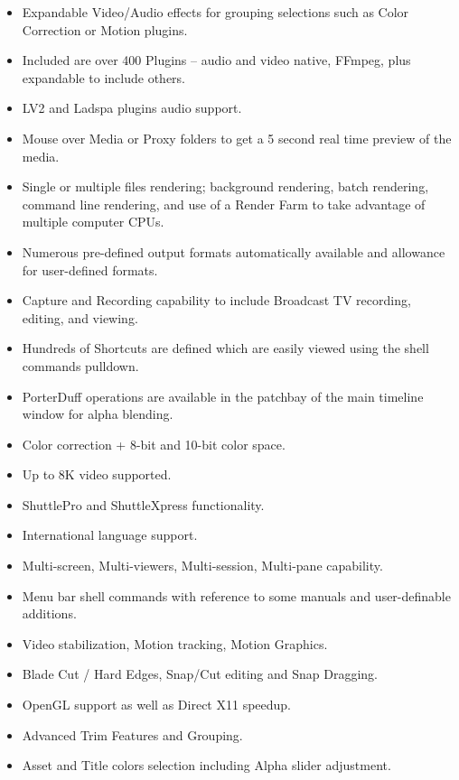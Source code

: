 \begin{description}
\begin{itemize}
                \item Expandable Video/Audio effects for grouping selections such as Color Correction or Motion plugins.
                \item Included are over 400 Plugins – audio and video native, FFmpeg, plus expandable to include others.
                \item LV2 and Ladspa plugins audio support.
                \item Mouse over Media or Proxy folders to get a 5 second real time preview of the media.
                \item Single or multiple files rendering; background rendering, batch rendering, command line rendering, and use of a Render Farm to take advantage of multiple computer CPUs.
                \item Numerous pre-defined output formats automatically available and allowance for user-defined formats.
                \item Capture and Recording capability to include Broadcast TV recording, editing, and viewing.
                \item Hundreds of Shortcuts are defined which are easily viewed using the shell commands pulldown.
                \item PorterDuff operations are available in the patchbay of the main timeline window for alpha blending.
                \item Color correction + 8-bit and 10-bit color space.
                \item Up to 8K video supported.
                \item ShuttlePro and ShuttleXpress functionality.
                \item International language support.
                \item Multi-screen, Multi-viewers, Multi-session, Multi-pane capability.
                \item Menu bar shell commands with reference to some manuals and user-definable additions.
                \item Video stabilization, Motion tracking, Motion Graphics.
                \item Blade Cut / Hard Edges, Snap/Cut editing and Snap Dragging.
                \item OpenGL support as well as Direct X11 speedup.
                \item Advanced Trim Features and Grouping.
                \item Asset and Title colors selection including Alpha slider adjustment.

\end{itemize}
\end{description}
